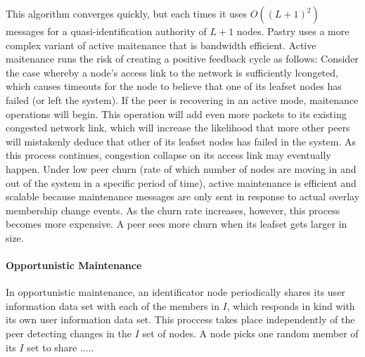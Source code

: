  This algorithm converges quickly, but each times it uses $O((L+1)^2)$ messages
for a quasi-identification authority of $L+1$ nodes.
Pastry uses a more complex variant of active maitenance that is
bandwidth efficient.
Active maitenance runs the risk of creating a positive feedback cycle as
follows: Consider the case whereby a node's access link to the network is
sufficiently lcongeted, which causes timeouts for the node to believe that one
of its leafset nodes has failed (or left the system). If the peer is recovering
in an active mode, maitenance operations will begin. This operation will add
even more packets to its existing congested network link, which will increase
the likelihood that more other peers will mistakenly deduce that other of its leafset
nodes has failed in the system. As this process continues, congestion collapse
on its access link may eventually happen.
Under low peer churn (rate of which number of nodes are moving in and out of the
system in a specific period of time), active maintenance is efficient and scalable because
maintenance messages are only sent in response to actual overlay membership
change events. As the churn rate increases, however, this process becomes more
expensive. A peer sees more churn when its leafset gets larger in size.


\paragraph{Opportunistic Maintenance}

In opportunistic maintenance, an identificator node periodically shares its user information
data set with each of the members in $I$, which responds in kind with its own
user information data set. This proccess takes place independently of the peer
detecting changes in the $I$ set of nodes. A node picks one random member of
its $I$ set to share .....

